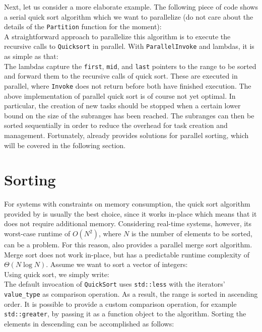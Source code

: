 Next, let us consider a more elaborate example. The following piece of code shows a serial quick sort algorithm which we want to parallelize (do not care about the details of the \lstinline|Partition| function for the moment):
%
\\
%
A straightforward approach to parallelize this algorithm is to execute the recursive calls to \lstinline|Quicksort| in parallel. With \lstinline|ParallelInvoke| and lambdas, it is as simple as that:
%
\\
%
The lambdas capture the \lstinline|first|, \lstinline|mid|, and \lstinline|last| pointers to the range to be sorted and forward them to the recursive calls of quick sort. These are executed in parallel, where \lstinline|Invoke| does not return before both have finished execution. The above implementation of parallel quick sort is of course not yet optimal. In particular, the creation of new tasks should be stopped when a certain lower bound on the size of the subranges has been reached. The subranges can then be sorted sequentially in order to reduce the overhead for task creation and management. Fortunately, {\embb} already provides solutions for parallel sorting, which will be covered in the following section.

\section{Sorting}
\label{sec:algorithms_sorting}

For systems with constraints on memory consumption, the quick sort algorithm provided by \embb is usually the best choice, since it works in-place which means that it does not require additional memory. Considering real-time systems, however, its worst-case runtime of $O(N^2)$, where $N$ is the number of elements to be sorted, can be a problem. For this reason, {\embb} also provides a parallel merge sort algorithm. Merge sort does not work in-place, but has a predictable runtime complexity of $\Theta(N \log N)$. Assume we want to sort a vector of integers:
%
\\
%
Using quick sort, we simply write:
%
\\
%
The default invocation of \lstinline|QuickSort| uses \lstinline|std::less| with the iterators' \lstinline|value_type| as comparison operation. As a result, the range is sorted in ascending order. It is possible to provide a custom comparison operation, for example \lstinline|std::greater|, by passing it as a function object to the algorithm. Sorting the elements in descending can be accomplished as follows:
%
\\

